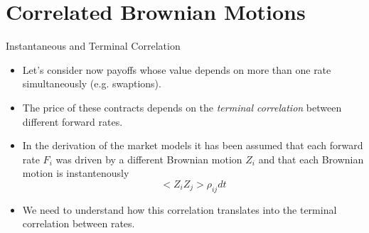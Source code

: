 \documentclass{beamer}
\begin{document}
%

\section{Correlated Brownian Motions}
\begin{frame}{Instantaneous and Terminal Correlation}
\begin{itemize}
\item Let's consider now payoffs whose value depends on more than one rate simultaneously (e.g. swaptions).
\item The price of these contracts depends on the \emph{terminal correlation} between different forward rates.
\item In the derivation of the market models it has been assumed that each forward rate $F_i$ was driven by a different Brownian motion $Z_i$ and that each Brownian motion is instantenously 
\begin{equation}
< Z_i Z_j> \rho_{ij} dt
\end{equation}
\item We need to understand how this correlation translates into the terminal correlation between rates.
\end{itemize}
\end{frame}
\end{document}
